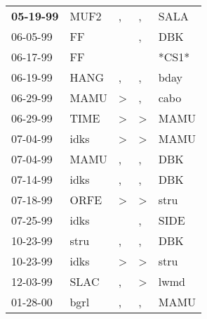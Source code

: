 \begin{supertabular}{p{0.07\textwidth}p{0.06\textwidth}p{0.02\textwidth}p{0.02\textwidth}p{0.06\textwidth}}
 \textbf{05-19-99\textsuperscript{}} &           MUF2\textsuperscript{} &                , &             , &           SALA\textsuperscript{} \\
          06-05-99\textsuperscript{} &             FF\textsuperscript{} &                  &             , &            DBK\textsuperscript{} \\
          06-17-99\textsuperscript{} &             FF\textsuperscript{} &                  &               &                            *CS1* \\
          06-19-99\textsuperscript{} &           HANG\textsuperscript{} &                , &             , &           bday\textsuperscript{} \\
          06-29-99\textsuperscript{} &           MAMU\textsuperscript{} &     \textgreater &             , &           cabo\textsuperscript{} \\
          06-29-99\textsuperscript{} &           TIME\textsuperscript{} &     \textgreater &  \textgreater &           MAMU\textsuperscript{} \\
          07-04-99\textsuperscript{} &           idks\textsuperscript{} &     \textgreater &  \textgreater &           MAMU\textsuperscript{} \\
          07-04-99\textsuperscript{} &           MAMU\textsuperscript{} &                , &             , &            DBK\textsuperscript{} \\
          07-14-99\textsuperscript{} &           idks\textsuperscript{} &                , &             , &            DBK\textsuperscript{} \\
          07-18-99\textsuperscript{} &           ORFE\textsuperscript{} &     \textgreater &  \textgreater &           stru\textsuperscript{} \\
          07-25-99\textsuperscript{} &           idks\textsuperscript{} &                  &             , &           SIDE\textsuperscript{} \\
          10-23-99\textsuperscript{} &           stru\textsuperscript{} &                , &             , &            DBK\textsuperscript{} \\
          10-23-99\textsuperscript{} &           idks\textsuperscript{} &     \textgreater &  \textgreater &           stru\textsuperscript{} \\
          12-03-99\textsuperscript{} &           SLAC\textsuperscript{} &                , &  \textgreater &           lwmd\textsuperscript{} \\
          01-28-00\textsuperscript{} &           bgrl\textsuperscript{} &                , &             , &           MAMU\textsuperscript{} \\

\end{supertabular}
